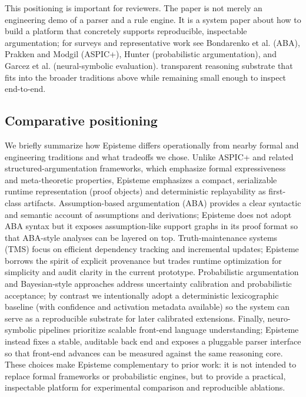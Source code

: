 \documentclass[11pt]{article}
\begin{document}
This positioning is important for reviewers. The paper is not merely an engineering
demo of a parser and a rule engine. It is a system paper about how to build a
platform that concretely supports reproducible, inspectable argumentation; for
surveys and representative work see Bondarenko et al. (ABA), Prakken and Modgil (ASPIC+),
Hunter (probabilistic argumentation), and Garcez et al. (neural-symbolic evaluation)\cite{Bondarenko1997,ModgilPrakken2013,Hunter2013,Garcez2019}.
transparent reasoning substrate that fits into the broader traditions above while
remaining small enough to inspect end-to-end.

\subsection{Comparative positioning}
We briefly summarize how Episteme differs operationally from nearby formal and
engineering traditions and what tradeoffs we chose. Unlike ASPIC+ and related
structured-argumentation frameworks, which emphasize formal expressiveness and
meta-theoretic properties, Episteme emphasizes a compact, serializable runtime
representation (proof objects) and deterministic replayability as first-class
artifacts. Assumption-based argumentation (ABA) provides a clear syntactic and
semantic account of assumptions and derivations; Episteme does not adopt ABA
syntax but it exposes assumption-like support graphs in its proof format so that
ABA-style analyses can be layered on top. Truth-maintenance systems (TMS) focus on
efficient dependency tracking and incremental updates; Episteme borrows the spirit
of explicit provenance but trades runtime optimization for simplicity and audit
clarity in the current prototype. Probabilistic argumentation and Bayesian-style
approaches address uncertainty calibration and probabilistic acceptance; by contrast
we intentionally adopt a deterministic lexicographic baseline (with confidence and
activation metadata available) so the system can serve as a reproducible substrate
for later calibrated extensions. Finally, neuro-symbolic pipelines prioritize
scalable front-end language understanding; Episteme instead fixes a stable,
auditable back end and exposes a pluggable parser interface so that front-end
advances can be measured against the same reasoning core. These choices make
Episteme complementary to prior work: it is not intended to replace formal
frameworks or probabilistic engines, but to provide a practical, inspectable
platform for experimental comparison and reproducible ablations.
\end{document}

